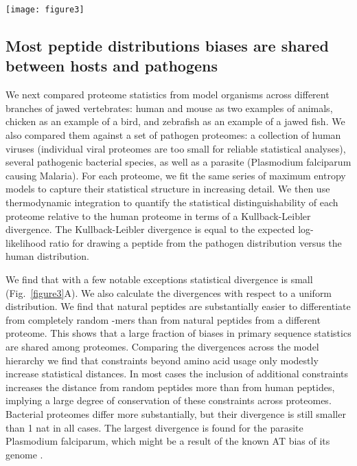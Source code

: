 \documentclass[superscriptaddress,twocolumn,pre]{revtex4}
\newcommand{\<}{\langle}
\renewcommand{\>}{\rangle}
\begin{document}
\begin{figure*}
    \begin{center}
        \texttt{[image: figure3]}
    \end{center}
    \caption{
        {\bf Divergence between peptides from different proteomes.}
        (A) Kullback-Leibler divergences between peptide distributions of different pathogen proteomes relative to human host peptides and relative to a uniform distribution over all peptides. For each proteome we show the statistical distance calculated according to a nested set of models including a different number of constraints. The inset shows a zoom on the set of proteomes close to the human statistics. (B, C) Performance of the models as classifiers. (B) Sensitivity-specificity tradeoff curve for various models. (C) Precision-recall characteristics at a 10-fold excess of self-peptides.
    \label{figure3}
    }
\end{figure*}

\subsection{Most peptide distributions biases are shared between hosts and pathogens}

We next compared proteome statistics from model organisms across different branches of jawed vertebrates: human and mouse as two examples of animals, chicken as an example of a bird, and zebrafish as an example of a jawed fish. We also compared them against a set of pathogen proteomes: a collection of human viruses (individual viral proteomes are too small for reliable statistical analyses), several pathogenic bacterial species, as well as a parasite (Plasmodium falciparum causing Malaria). For each proteome, we fit the same series of maximum entropy models to capture their statistical structure in increasing detail. We then use thermodynamic integration to quantify the statistical distinguishability of each proteome relative to the human proteome in terms of a Kullback-Leibler divergence. The Kullback-Leibler divergence is equal to the expected log-likelihood ratio for drawing a peptide from the pathogen distribution versus the human distribution. 

We find that with a few notable exceptions statistical divergence is small (Fig.~\ref{figure3}A). We also calculate the divergences with respect to a uniform distribution. We find that natural peptides are substantially easier to differentiate from completely random -mers than from natural peptides from a different proteome. This shows that a large fraction of biases in primary sequence statistics are shared among proteomes. Comparing the divergences across the model hierarchy we find that constraints beyond amino acid usage only modestly increase statistical distances. In most cases the inclusion of additional constraints increases the distance from random peptides more than from human peptides, implying a large degree of conservation of these constraints across proteomes. Bacterial proteomes differ more substantially, but their divergence is still smaller than 1 nat in all cases. The largest divergence is found for the parasite Plasmodium falciparum, which might be a result of the known AT bias of its genome \cite{Hamilton2017}.
\end{document}
